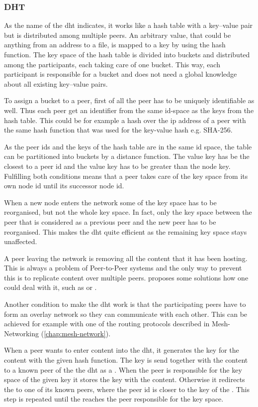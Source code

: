 \subsubsection{DHT}
As the name of the \gls{dht} indicates, it works like a hash table with a key–value pair but is distributed among multiple peers. An arbitrary value, that could be anything from an address to a file, is mapped to a key by using the hash function. The key space of the hash table is divided into buckets and distributed among the participants, each taking care of one bucket. This way, each participant is responsible for a bucket and does not need a global knowledge about all existing key–value pairs.

To assign a bucket to a peer, first of all the peer has to be uniquely identifiable as well. Thus each peer get an identifier from the same id-space as the keys from the hash table. This could be for example a hash over the \gls{ip} address of a peer with the same hash function that was used for the key-value hash e.g. SHA-256.

As the peer ids and the keys of the hash table are in the same id space, the table can be partitioned into buckets by a distance function. The value key has be the closest to a peer id and the value key has to be greater than the node key. Fulfilling both conditions means that a peer takes care of the key space from its own node id until its successor node id.

When a new node enters the network some of the key space has to be reorganised, but not the whole key space. In fact, only the key space between the peer that is considered as a previous peer and the new peer has to be reorganised. This makes the \gls{dht} quite efficient as the remaining key space stays unaffected. 

A peer leaving the network is removing all the content that it has been hosting. This is always a problem of Peer-to-Peer systems and the only way to prevent this is to replicate content over multiple peers. \citet[\S3]{chord} proposes some solutions how one could deal with it, such as  or .

Another condition to make the \gls{dht} work is that the participating peers have to form an overlay network so they can communicate with each other. This can be achieved for example with one of the routing protocols described in Mesh-Networking (\vref{chap:mesh-network}).

When a peer wants to enter content into the \gls{dht}, it generates the key for the content with the given hash function. The key is send together with the content to a known peer of the the \gls{dht} as a . When the peer is responsible for the key space of the given key it stores the key with the content. Otherwise it redirects the  to one of its known peers, where the peer id is closer to the key of the . This step is repeated until the  reaches the peer responsible for the key space.


